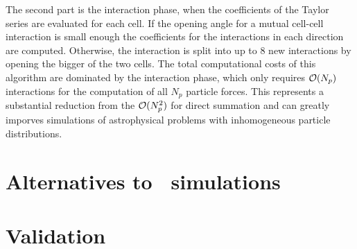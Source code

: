 The second part is the interaction phase, when the coefficients of the Taylor series are evaluated for each cell. If the opening angle for a mutual cell-cell interaction is small enough the coefficients for the interactions in each direction are computed.  Otherwise, the interaction is split into up to 8 new interactions by opening the bigger of the two cells. The total computational
costs of this algorithm are dominated by the interaction phase, which only requires $\mathcal{O}(N_p)$ interactions for the computation of all $N_p$ particle forces. This represents a substantial reduction from the $\mathcal{O}(N_p^2)$ for direct summation and can greatly imporves simulations of astrophysical problems with inhomogeneous particle distributions.
\section{Alternatives to \nbody\ simulations}

\section{Validation}